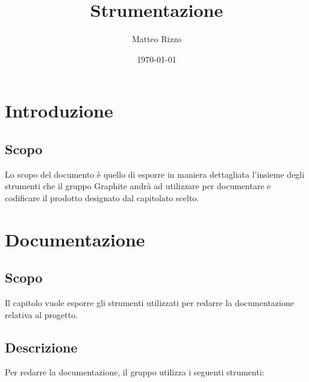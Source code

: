 \documentclass[openany,12pt,a4paper]{report}
\title{Strumentazione}
\author{Matteo Rizzo}
\date{\today}
\begin{document}
\maketitle

 
\tableofcontents{}


\chapter{Introduzione}

\section{Scopo}

Lo scopo del documento è quello di esporre in maniera dettagliata l'insieme degli strumenti che il gruppo Graphite andrà ad utilizzare per documentare e codificare il prodotto designato dal capitolato scelto.


\chapter{Documentazione}

\section{Scopo}

Il capitolo vuole esporre gli strumenti utilizzati per redarre la documentazione relativa al progetto. 

\section{Descrizione}

Per redarre la documentazione, il gruppo utilizza i seguenti strumenti:
\end{document}
